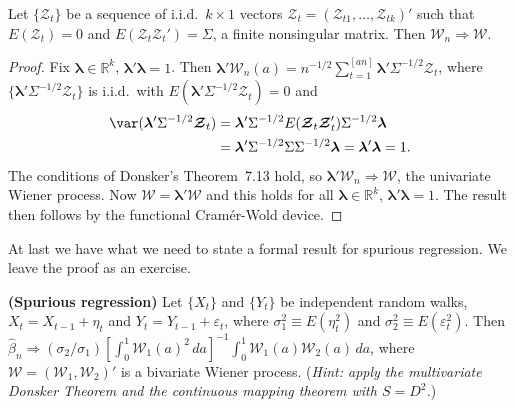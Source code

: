 \begin{theorem}\label{thm:multivariate-donsker}
Let $\{\boldsymbol{\mathcal{Z}}_t\}$ be a sequence of i.i.d.\ $k \times 1$ vectors $\boldsymbol{\mathcal{Z}}_t = (\mathcal{Z}_{t1}, \ldots, \mathcal{Z}_{tk})'$ such that $E(\boldsymbol{\mathcal{Z}}_t) = 0$ and $E(\boldsymbol{\mathcal{Z}}_t \boldsymbol{\mathcal{Z}}_t') = \Sigma$, a finite nonsingular matrix. Then $\boldsymbol{\mathcal{W}}_n \Rightarrow \boldsymbol{\mathcal{W}}$.
\end{theorem}

\begin{proof}
Fix $\boldsymbol{\lambda} \in \mathbb{R}^k$, $\boldsymbol{\lambda}'\boldsymbol{\lambda} = 1$. Then $\boldsymbol{\lambda}'\boldsymbol{\mathcal{W}}_n(a) = n^{-1/2}\sum_{t=1}^{[an]} \boldsymbol{\lambda}'\Sigma^{-1/2}\boldsymbol{\mathcal{Z}}_t$, where $\{\boldsymbol{\lambda}'\Sigma^{-1/2}\boldsymbol{\mathcal{Z}}_t\}$ is i.i.d.\ with $E(\boldsymbol{\lambda}'\Sigma^{-1/2}\boldsymbol{\mathcal{Z}}_t) = 0$ and
\begin{align*}
\var(\boldsymbol{\lambda}'\Sigma^{-1/2}\boldsymbol{\mathcal{Z}}_t) &= \boldsymbol{\lambda}'\Sigma^{-1/2}E(\boldsymbol{\mathcal{Z}}_t \boldsymbol{\mathcal{Z}}_t')\Sigma^{-1/2}\boldsymbol{\lambda} \\
&= \boldsymbol{\lambda}'\Sigma^{-1/2}\Sigma\Sigma^{-1/2}\boldsymbol{\lambda} = \boldsymbol{\lambda}'\boldsymbol{\lambda} = 1.
\end{align*}
The conditions of Donsker's Theorem~7.13 hold, so $\boldsymbol{\lambda}'\boldsymbol{\mathcal{W}}_n \Rightarrow \mathcal{W}$, the univariate Wiener process. Now $\mathcal{W} = \boldsymbol{\lambda}'\boldsymbol{\mathcal{W}}$ and this holds for all $\boldsymbol{\lambda} \in \mathbb{R}^k$, $\boldsymbol{\lambda}'\boldsymbol{\lambda} = 1$. The result then follows by the functional Cram\'{e}r-Wold device.
\end{proof}

At last we have what we need to state a formal result for spurious regression. We leave the proof as an exercise.

\begin{exercises}
\item\label{ex:7.28} \textbf{(Spurious regression)} Let $\{X_t\}$ and $\{Y_t\}$ be independent random walks, $X_t = X_{t-1} + \eta_t$ and $Y_t = Y_{t-1} + \varepsilon_t$, where $\sigma_1^2 \equiv E(\eta_t^2)$ and $\sigma_2^2 \equiv E(\varepsilon_t^2)$. Then $\hat{\beta}_n \Rightarrow (\sigma_2/\sigma_1)\left[\int_0^1 \mathcal{W}_1(a)^2\,da\right]^{-1}\int_0^1 \mathcal{W}_1(a)\mathcal{W}_2(a)\,da$, where $\boldsymbol{\mathcal{W}} = (\mathcal{W}_1, \mathcal{W}_2)'$ is a bivariate Wiener process. (\emph{Hint: apply the multivariate Donsker Theorem and the continuous mapping theorem with $S = D^2$.})
\end{exercises}

